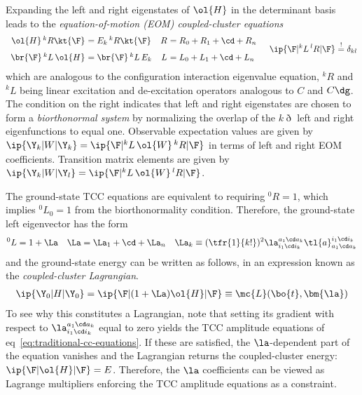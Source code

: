 \begin{dfn}
Expanding the left and right eigenstates of $\ol{H}$ in the determinant basis leads to the \textit{equation-of-motion (EOM) coupled-cluster equations}
\begin{align}
\begin{array}{r@{\ }lr@{\ }l}
  \ol{H}
  \,{}^kR
  \kt{\F}
&
=
  E_k
  \,{}^kR
  \kt{\F}
&
  R
&=
  R_0
+
  R_1
+
  \cd
+
  R_n
\\[7pt]
  \br{\F}
  \,{}^kL\,
  \ol{H}
&=
  \br{\F}
  \,{}^kL\,
  E_k
&
  L
&=
  L_0
+
  L_1
+
  \cd
+
  L_n
\end{array}
&&
  \ip{\F|
    {}^kL\,
    {}^lR
  |\F}
\overset{!}{=}
  \delta_{kl}
\end{align}
which are analogous to the configuration interaction eigenvalue equation, ${}^kR$ and ${}^kL$ being linear excitation and de-excitation operators analogous to $C$ and $C\dg$.
The condition on the right indicates that left and right eigenstates are chosen to form a \textit{biorthonormal system} by normalizing the overlap of the $k\eth$ left and right eigenfunctions to equal one.
Observable expectation values are given by
$
  \ip{\Y_k|W|\Y_k}
=
  \ip{\F|{}^kL\,\ol{W}\,{}^kR|\F}
$
in terms of left and right EOM coefficients.
Transition matrix elements are given by
$
  \ip{\Y_k|W|\Y_l}
=
  \ip{\F|{}^kL\,\ol{W}\,{}^lR|\F}
$.
\end{dfn}

\begin{dfn}
The ground-state TCC equations are equivalent to requiring ${}^0R=1$, which implies ${}^0L_0=1$ from the biorthonormality condition.
Therefore, the ground-state left eigenvector has the form
\begin{align}
\label{eq:cc-ground-state-wave-operators}
  {}^0L
=
  1
+
  \La
&&
  \La
=
  \La_1
+
  \cd
+
  \La_n
&&
  \La_k
\equiv
  (\tfr{1}{k!})^2
  \la_{i_1\cd i_k}^{a_1\cd a_k}
  \tl{a}^{i_1\cd i_k}_{a_1\cd a_k}
\end{align}
and the ground-state energy can be written as follows, in an expression known as the \textit{coupled-cluster Lagrangian}.
\begin{align}
  \ip{\Y_0|H|\Y_0}
=
  \ip{\F|
    (
      1
    +
      \La
    )
    \ol{H}
  |\F}
\equiv
  \mc{L}(\bo{t},\bm{\la})
\end{align}
To see why this constitutes a Lagrangian, note that setting its gradient with respect to $\la_{i_1\cd i_k}^{a_1\cd a_k}$ equal to zero yields the TCC amplitude equations of eq~\ref{eq:traditional-cc-equations}.
If these are satisfied, the $\la$-dependent part of the equation vanishes and the Lagrangian returns the coupled-cluster energy:
$
  \ip{\F|\ol{H}|\F}
=
  E
$.
Therefore, the $\la$ coefficients can be viewed as Lagrange multipliers enforcing the TCC amplitude equations as a constraint.
\end{dfn}


